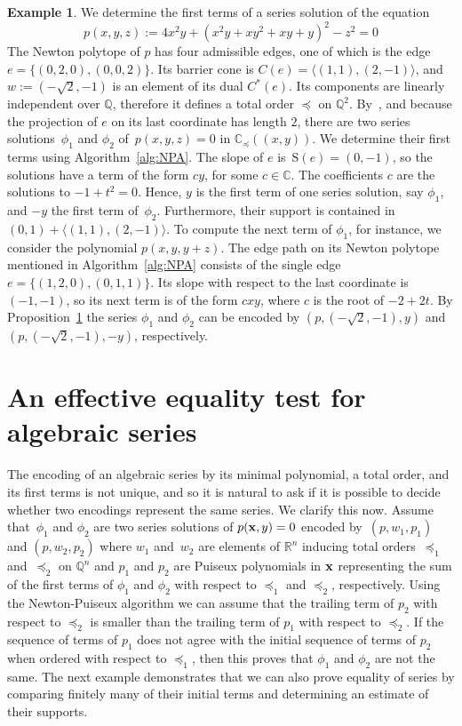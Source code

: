 \documentclass[a4paper,draft]{amsart}
\theoremstyle{definition}
\newtheorem{Example}{Example}
\begin{document}
\begin{Example}\label{ex:NPA}
We determine the first terms of a series solution of the equation
\begin{equation*}
p(x,y,z) := 4x^2y+(x^2y+xy^2+xy+y)^2-z^2 = 0
\end{equation*} 
The Newton polytope of $p$ has four admissible edges, one of which is the edge~$e=\{(0,2,0),(0,0,2)\}$. Its barrier cone is $C(e)=\langle (1,1),(2,-1) \rangle$, and $w:=(-\sqrt{2},-1)$ is an element of its dual $C^*(e)$. Its components are linearly independent over $\mathbb{Q}$, therefore it defines a total order $\preceq$ on $\mathbb{Q}^2$. By~\cite[Theorem 3.5]{MacDonald}, and because the projection of $e$ on its last coordinate has length $2$, there are two series solutions~$\phi_1$ and $\phi_2$ of~$p(x,y,z)=0$ in $\mathbb{C}_\preceq((x,y))$. We determine their first terms using Algorithm~\ref{alg:NPA}. The slope of $e$ is~$\mathrm{S}(e) = (0,-1)$, so the solutions have a term of the form $c y$, for some $c\in\mathbb{C}$. The coefficients $c$ are the solutions to $-1+t^2 = 0$. Hence, $y$ is the first term of one series solution, say $\phi_1$, and $-y$ the first term of~$\phi_2$. Furthermore, their support is contained in $(0,1) + \langle (1,1),(2,-1)\rangle$. To compute the next term of $\phi_1$, for instance, we consider the polynomial $p(x,y,y+z)$. The edge path on its Newton polytope mentioned in Algorithm~\ref{alg:NPA} consists of the single edge $e=\{(1,2,0),(0,1,1)\}$. Its slope with respect to the last coordinate is~$(-1,-1)$, so its next term is of the form $c xy$, where $c$ is the root of $-2+2t$. By Proposition~\ref{ex:NPA} the series $\phi_1$ and $\phi_2$ can be encoded by $(p,(-\sqrt{2},-1),y)$ and $(p,(-\sqrt{2},-1),-y)$, respectively.
\end{Example}

\section{An effective equality test for algebraic series}\label{sec:equ}

The encoding of an algebraic series by its minimal polynomial, a total order, and its first terms is not unique, and so it is natural to ask if it is possible to decide whether two encodings represent the same series. We clarify this now. Assume that~$\phi_1$ and $\phi_2$ are two series solutions of $p(\bold{x},y)=0$ encoded by~$(p,w_1,p_1)$ and $(p,w_2,p_2)$ where $w_1$ and~$w_2$ are elements of $\mathbb{R}^n$ inducing total orders~$\preceq_1$ and~$\preceq_2$ on $\mathbb{Q}^n$ and $p_1$ and $p_2$ are Puiseux polynomials in $\bold{x}$ representing the sum of the first terms of $\phi_1$ and $\phi_2$ with respect to $\preceq_1$ and $\preceq_2$, respectively. Using the Newton-Puiseux algorithm we can assume that the trailing term of $p_2$ with respect to $\preceq_2$ is smaller than the trailing term of $p_1$ with respect to $\preceq_2$. If the sequence of terms of $p_1$ does not agree with the initial sequence of terms of $p_2$ when ordered with respect to $\preceq_1$, then this proves that $\phi_1$ and $\phi_2$ are not the same. The next example demonstrates that we can also prove equality of series by comparing finitely many of their initial terms and determining an estimate of their supports.
\end{document}
